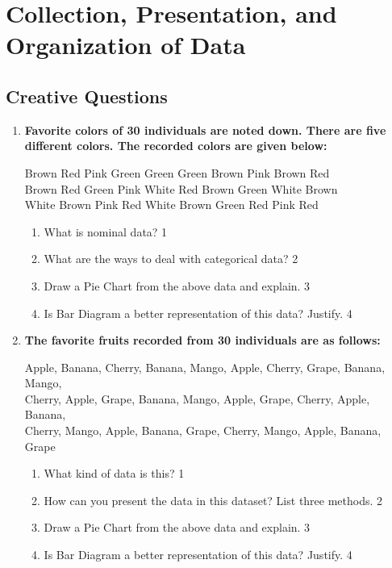 \documentclass[a4paper,oneside]{book}
\begin{document}
\chapter{Collection, Presentation, and Organization of Data} 

\section{Creative Questions}

    \begin{enumerate}
  
     \item
	  \textbf{Favorite colors of 30 individuals are noted down. There are five different colors. The recorded colors are given below:}
	  
	  \begin{centering}
	  Brown Red   Pink  Green Green Green Brown Pink  Brown Red   \\
    Brown Red   Green Pink  White Red   Brown Green White Brown \\
    White Brown Pink  Red   White Brown Green Red   Pink  Red  \\
    \end{centering}
    
  
  \begin{enumerate}
    \item
	What is nominal data? \hfill 1
    \item
	What are the ways to deal with categorical data? \hfill 2
    \item  
	Draw a Pie Chart from the above data and explain. \hfill 3
    \item
	Is Bar Diagram a better representation of this data? Justify. \hfill 4
  \end{enumerate}
  
  \item
	  \textbf{The favorite fruits recorded from 30 individuals are as follows:} 
	  
	   \begin{centering}
    Apple, Banana, Cherry, Banana, Mango, Apple, Cherry, Grape, Banana, Mango, \\
    Cherry, Apple, Grape, Banana, Mango, Apple, Grape, Cherry, Apple, Banana, \\
    Cherry, Mango, Apple, Banana, Grape, Cherry, Mango, Apple, Banana, Grape \\
    \end{centering}
  
  \begin{enumerate}
    \item
	What kind of data is this? \hfill 1
    \item
	How can you present the data in this dataset? List three methods. \hfill 2
    \item  
	Draw a Pie Chart from the above data and explain. \hfill 3
    \item
	Is Bar Diagram a better representation of this data? Justify. \hfill 4
  \end{enumerate}
  

\end{enumerate}
\end{document}
